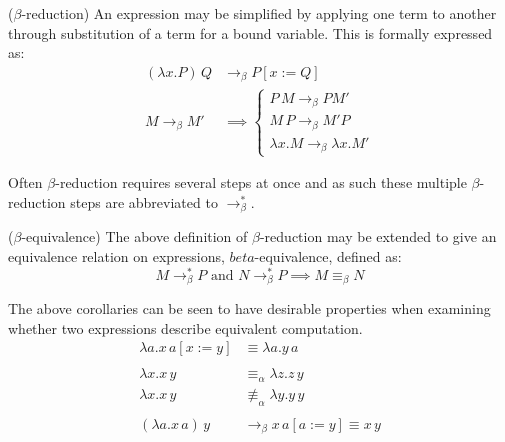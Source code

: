 \documentclass{article}
\begin{document}
        \begin{definition}{($\beta$-reduction)}
            An expression may be simplified by applying one term to another through substitution of a term for a bound variable.
            This is formally expressed as:
            \begin{align}
                (\lambda x . P) \, Q   & \rightarrow_\beta P[x := Q] \\
                M \rightarrow_\beta M' & \implies
                    \begin{cases}
                        P \, M \rightarrow_\beta P M' \\
                        M \, P \rightarrow_\beta M' P \\
                        \lambda x . M \rightarrow_\beta \lambda x . M'
                    \end{cases}
            \end{align}
        \end{definition}
        Often $\beta$-reduction requires several steps at once and as such these multiple $\beta$-reduction steps are abbreviated to $\rightarrow_\beta^*$.

        \begin{corollary*}{($\beta$-equivalence)}
            The above definition of $\beta$-reduction may be extended to give an equivalence relation on expressions, $beta$-equivalence, defined as:
            \begin{equation}
                M \rightarrow_\beta^* P \text{ and } N \rightarrow_\beta^* P \implies M \equiv_\beta N
            \end{equation}
        \end{corollary*}
        
        \begin{example*}
            The above corollaries can be seen to have desirable properties when examining whether two expressions describe equivalent computation.
            \begin{align*}
                \lambda a . x \, a [x := y] & \equiv \lambda a . y \, a \\
                \\
                \lambda x . x \, y & \equiv_\alpha \lambda z . z \, y \\
                \lambda x . x \, y & \not\equiv_\alpha \lambda y . y \, y \\
                \\
                (\lambda a . x \, a) \, y & \rightarrow_\beta x \, a [a := y] \equiv x \, y
            \end{align*}
        \end{example*}
\end{document}
